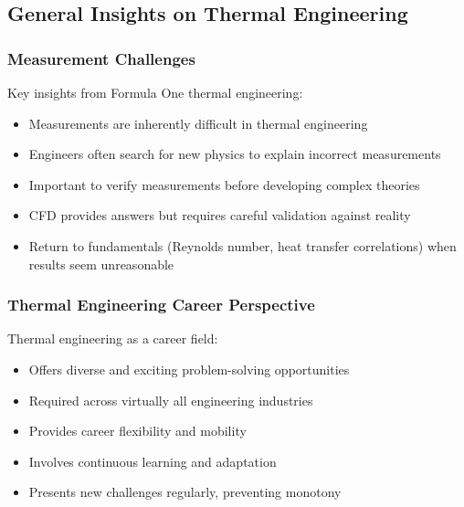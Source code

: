 \subsection*{General Insights on Thermal Engineering}

\subsubsection*{Measurement Challenges}

Key insights from Formula One thermal engineering:
\begin{itemize}
    \item Measurements are inherently difficult in thermal engineering
    \item Engineers often search for new physics to explain incorrect measurements
    \item Important to verify measurements before developing complex theories
    \item CFD provides answers but requires careful validation against reality
    \item Return to fundamentals (Reynolds number, heat transfer correlations) when results seem unreasonable
\end{itemize}

\subsubsection*{Thermal Engineering Career Perspective}

Thermal engineering as a career field:
\begin{itemize}
    \item Offers diverse and exciting problem-solving opportunities
    \item Required across virtually all engineering industries
    \item Provides career flexibility and mobility
    \item Involves continuous learning and adaptation
    \item Presents new challenges regularly, preventing monotony
\end{itemize}


